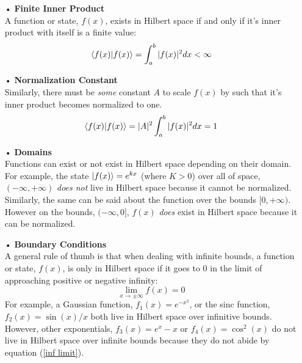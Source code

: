 \documentclass[12pt,letterpaper]{book}
\begin{document}
\begin{enumerate}

\item[•]\textbf{Finite Inner Product}\\
A function or state, $f(x)$, exists in Hilbert space if and only if it's inner product with itself is a finite value:
\begin{equation}
\label{hilbert}
\braket{f(x)}{f(x)} = \int_a^b |f(x)|^2 dx < \infty
\end{equation}

\item[•]\textbf{Normalization Constant}\\
Similarly, there must be \textit{some} constant $A$ to scale $f(x)$ by such that it's inner product becomes normalized to one.
\begin{equation}
\braket{f(x)}{f(x)} = |A|^2\int_a^b |f(x)|^2 dx =1
\end{equation}

\item[•]\textbf{Domains}\\
Functions can exist or not exist in Hilbert space depending on their domain. For example, the state 
$\ket{f(x)} = e^{kx}$ (where $K > 0$) over all of space, $(-\infty,+\infty)$ \textit{does not} live in Hilbert space because it cannot be normalized. Similarly, the same can be said about the function over the bounds $[0,+\infty)$. However on the bounds, $(-\infty,0]$, $f(x)$ \textit{does} exist in Hilbert space because it can be normalized.

\item[•]\textbf{Boundary Conditions}\\
A general rule of thumb is that when dealing with infinite bounds, a function or state, $f(x)$, is only in Hilbert space if it goes to $0$ in the limit of approaching positive or negative infinity:
\begin{equation}
\label{inf limit}
\lim_{x \rightarrow \pm \infty} f(x) = 0
\end{equation}
For example, a Gaussian function, $f_1(x) = e^{-x^2}$, or the sinc function, $f_2(x) = \sin(x)/x$ both live in Hilbert space over infinitive bounds. However, other exponentials, $f_3(x) = e^{x} - x$ or $f_4(x) = \cos^2(x)$ do not live in Hilbert space over infinite bounds because they do not abide by equation (\ref{inf limit}).

\end{enumerate}

 
\end{document}
